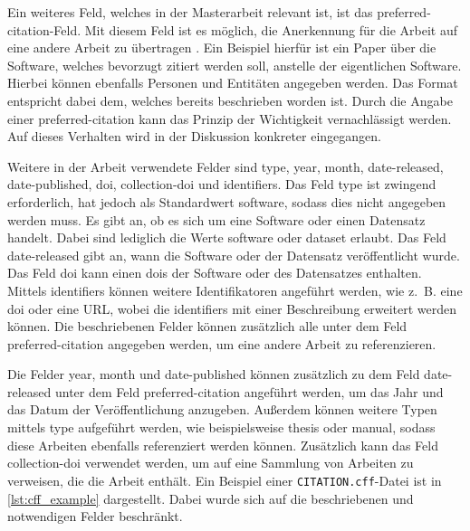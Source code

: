 Ein weiteres Feld, welches in der Masterarbeit relevant ist, ist das \glqq preferred-citation\grqq{}-Feld.
Mit diesem Feld ist es möglich, die Anerkennung für die Arbeit auf eine andere Arbeit zu übertragen \autocite{druskat_citation_2021}.
Ein Beispiel hierfür ist ein Paper über die Software, welches bevorzugt zitiert werden soll, anstelle der eigentlichen Software.
Hierbei können ebenfalls Personen und Entitäten angegeben werden.
Das Format entspricht dabei dem, welches bereits beschrieben worden ist.
Durch die Angabe einer \glqq preferred-citation\grqq{} kann das Prinzip der Wichtigkeit vernachlässigt werden.
Auf dieses Verhalten wird in der Diskussion konkreter eingegangen.

Weitere in der Arbeit verwendete Felder sind \glqq type\grqq{}, \glqq year\grqq{}, \glqq month\grqq{}, \glqq date-released\grqq{}, \glqq date-published\grqq{}, \glqq doi\grqq{}, \glqq collection-doi\grqq{} und \glqq identifiers\grqq{}.
Das Feld \glqq type\grqq{} ist zwingend erforderlich, hat jedoch als Standardwert \glqq software\grqq{}, sodass dies nicht angegeben werden muss.
Es gibt an, ob es sich um eine Software oder einen Datensatz handelt.
Dabei sind lediglich die Werte \glqq software\grqq{} oder \glqq dataset\grqq{} erlaubt.
Das Feld \glqq date-released\grqq{} gibt an, wann die Software oder der Datensatz veröffentlicht wurde.
Das Feld \glqq doi\grqq{} kann einen \glspl{doi} der Software oder des Datensatzes enthalten.
Mittels \glqq identifiers\grqq{} können weitere Identifikatoren angeführt werden, wie z. B. eine \gls{doi} oder eine URL, wobei die \glqq identifiers\grqq{} mit einer Beschreibung erweitert werden können.
Die beschriebenen Felder können zusätzlich alle unter dem Feld \glqq preferred-citation\grqq{} angegeben werden, um eine andere Arbeit zu referenzieren.

Die Felder \glqq year\grqq{}, \glqq month\grqq{} und \glqq date-published\grqq{} können zusätzlich zu dem Feld \glqq date-released\grqq{} unter dem Feld \glqq preferred-citation\grqq{} angeführt werden, um das Jahr und das Datum der Veröffentlichung anzugeben.
Außerdem können weitere Typen mittels \glqq type\grqq{} aufgeführt werden, wie beispielsweise \glqq thesis\grqq{} oder \glqq manual\grqq{}, sodass diese Arbeiten ebenfalls referenziert werden können.
Zusätzlich kann das Feld \glqq collection-doi\grqq{} verwendet werden, um auf eine Sammlung von Arbeiten zu verweisen, die die Arbeit enthält.
Ein Beispiel einer \texttt{CITATION.cff}-Datei ist in \autoref{lst:cff_example} dargestellt.
Dabei wurde sich auf die beschriebenen und notwendigen Felder beschränkt.

